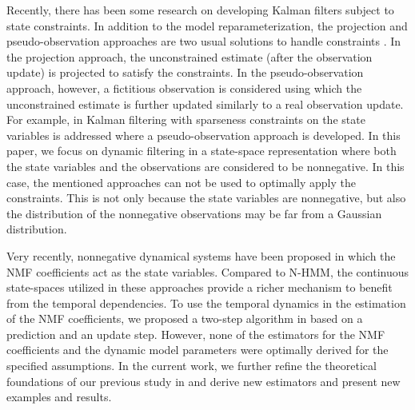\documentclass[10pt,twocolumn,twoside] {IEEEtran}
\begin{document}
Recently, there has been some research on developing Kalman filters
subject to state constraints. In addition to the model reparameterization,
the projection and pseudo-observation approaches are two usual solutions to handle constraints \cite{Julier2007,Simon2010,Carmi2010}. In the projection
approach, the unconstrained estimate (after the observation update) is projected
to satisfy the constraints. In the pseudo-observation approach, however,
a fictitious observation is considered using which the unconstrained
estimate is further updated similarly to a real observation update.
For example, in \cite{Carmi2010} Kalman filtering with sparseness constraints on the state
variables is addressed where a pseudo-observation
approach is developed. In this paper, we focus on dynamic filtering in
a state-space representation where both the state variables and the observations
are considered to be nonnegative. In this case, the mentioned approaches can not be
used to optimally apply the constraints. This is not only because
the state variables are nonnegative, but also the distribution of
the nonnegative observations may be far from a Gaussian distribution.

Very recently, nonnegative dynamical systems \cite{Mohammadiha2013b,Fevotte2013} have been proposed in which the NMF coefficients act as the state variables. Compared
to N-HMM, the continuous state-spaces utilized in these approaches provide
a richer mechanism to benefit from the temporal dependencies. To use the temporal dynamics in the estimation of the NMF coefficients, we proposed a two-step algorithm in \cite{Mohammadiha2013b} based on a prediction and an update step. However, none of the estimators for the NMF coefficients and the dynamic model parameters were optimally derived for the specified assumptions. In the current work, we further refine the theoretical foundations of our previous study in \cite{Mohammadiha2013b} and derive new estimators and present new examples and results.
\end{document}
